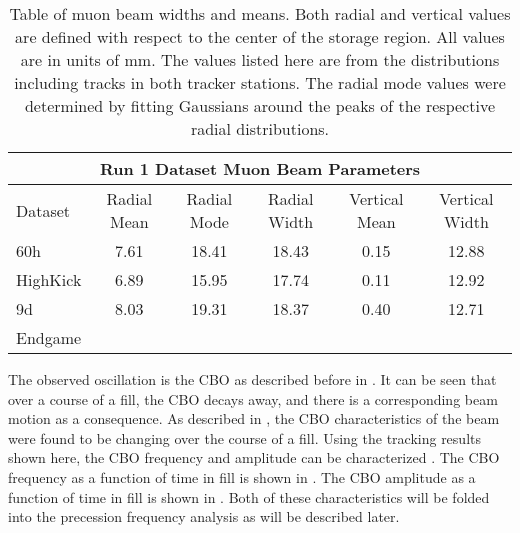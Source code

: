\begin{landscape}
\begin{table}[]
\centering
\setlength\tabcolsep{10pt}
\renewcommand{\arraystretch}{1.2}
\begin{tabular*}{1\linewidth}{@{\extracolsep{\fill}}lccccc}
  \hline
    \multicolumn{6}{c}{\textbf{Run 1 Dataset Muon Beam Parameters}} \\
  \hline\hline
    Dataset & Radial Mean & Radial Mode & Radial Width & Vertical Mean & Vertical Width \\
  \hline
    60h & 7.61 & 18.41 & 18.43 & 0.15 & 12.88 \\
    HighKick & 6.89 & 15.95 & 17.74 & 0.11 & 12.92 \\
    9d & 8.03 & 19.31 & 18.37 & 0.40 & 12.71 \\
    Endgame &  &  &  &  &  \\
  \hline
\end{tabular*}
\caption[Run 1 dataset muon beam parameters]{Table of muon beam widths and means. Both radial and vertical values are defined with respect to the center of the storage region. All values are in units of mm. The values listed here are from the distributions including tracks in both tracker stations. The radial mode values were determined by fitting Gaussians around the peaks of the respective radial distributions.}
\label{tab:MuonBeamParameters}
\end{table}
\end{landscape}





The observed oscillation is the CBO as described before in . It can be seen that over a course of a fill, the CBO decays away, and there is a corresponding beam motion as a consequence. As described in , the CBO characteristics of the beam were found to be changing over the course of a fill. Using the tracking results shown here, the CBO frequency and amplitude can be characterized \cite{cbofrequency}. The CBO frequency as a function of time in fill is shown in . The CBO amplitude as a function of time in fill is shown in . Both of these characteristics will be folded into the precession frequency analysis as will be described later.



